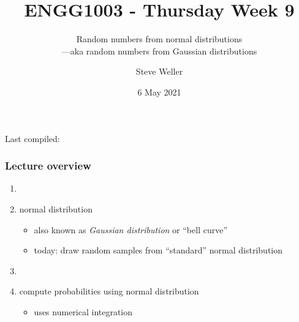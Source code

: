 \documentclass[english,14pt]{beamer}
\title{ENGG1003 - Thursday Week 9}
\subtitle{Random numbers from normal distributions \\
---aka random numbers from Gaussian distributions}
\author{Steve Weller}
\institute{University of Newcastle}
\date{6 May 2021}
\begin{document}
\begin{flushleft}
{\scriptsize Last compiled:~\DTMnow}
\vspace*{-5mm}
\end{flushleft}
\framebreak


\begin{frame}[fragile]

\frametitle{Lecture overview}
\begin{enumerate}
	\item[]
	
	\item normal distribution
	\begin{itemize}
		\item also known as \emph{Gaussian distribution} or ``bell curve''
		\item today: draw random samples from ``standard'' normal distribution
	\end{itemize}
	
	\item[]
	
	\item compute probabilities using normal distribution
	\begin{itemize}
		\item uses numerical integration
	\end{itemize}
	
%	
	
%	
	
\end{enumerate}

\end{frame}

\end{document}
